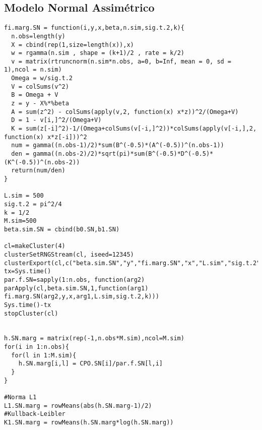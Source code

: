 \subsection{Modelo Normal Assimétrico}
\begin{lstlisting}
fi.marg.SN = function(i,y,x,beta,n.sim,sig.t.2,k){
  n.obs=length(y)
  X = cbind(rep(1,size=length(x)),x)
  w = rgamma(n.sim , shape = (k+1)/2 , rate = k/2)
  v = matrix(rtruncnorm(n.sim*n.obs, a=0, b=Inf, mean = 0, sd = 1),ncol = n.sim)
  Omega = w/sig.t.2
  V = colSums(v^2)
  B = Omega + V
  z = y - X%*%beta
  A = sum(z^2) - colSums(apply(v,2, function(x) x*z))^2/(Omega+V)
  D = 1 - v[i,]^2/(Omega+V)
  K = sum(z[-i]^2)-1/(Omega+colSums(v[-i,]^2))*colSums(apply(v[-i,],2, function(x) x*z[-i]))^2
  num = gamma((n.obs-1)/2)*sum(B^(-0.5)*(A^(-0.5))^(n.obs-1))
  den = gamma((n.obs-2)/2)*sqrt(pi)*sum(B^(-0.5)*D^(-0.5)*(K^(-0.5))^(n.obs-2))
  return(num/den)
}

L.sim = 500
sig.t.2 = pi^2/4
k = 1/2
M.sim=500
beta.sim.SN = cbind(b0.SN,b1.SN)

cl=makeCluster(4)
clusterSetRNGStream(cl, iseed=12345)
clusterExport(cl,c("beta.sim.SN","y","fi.marg.SN","x","L.sim","sig.t.2","k","rtruncnorm","n.obs"))
tx=Sys.time()
par.f.SN=sapply(1:n.obs, function(arg2) parApply(cl,beta.sim.SN,1,function(arg1) fi.marg.SN(arg2,y,x,arg1,L.sim,sig.t.2,k)))
Sys.time()-tx
stopCluster(cl)


h.SN.marg = matrix(rep(-1,n.obs*M.sim),ncol=M.sim)
for(i in 1:n.obs){
  for(l in 1:M.sim){
    h.SN.marg[i,l] = CPO.SN[i]/par.f.SN[l,i]
  }
}

#Norma L1
L1.SN.marg = rowMeans(abs(h.SN.marg-1)/2)
#Kullback-Leibler
K1.SN.marg = rowMeans(h.SN.marg*log(h.SN.marg))
\end{lstlisting}

